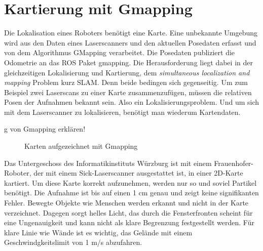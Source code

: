 \documentclass[11pt,a4paper]{article}
\begin{document}
{\section{Kartierung mit Gmapping} \cite{gmapping}
Die Lokalisation eines Roboters ben\"otigt eine Karte. Eine unbekannte Umgebung wird aus den Daten eines Laserscanners und den aktuellen Posedaten erfasst und von dem Algorithmus GMapping verarbeitet. Die Posedaten publiziert die Odometrie an das ROS Paket gmapping.
Die Herausforderung liegt dabei in der gleichzeitigen Lokalisierung und Kartierung, dem \textit{simultaneous localization and mapping} Problem kurz SLAM. Denn beide bedingen sich gegenseitig. Um zum Beispiel zwei Laserscans zu einer Karte zusammenzuf\"ugen, m\"ussen die relativen Posen der Aufnahmen bekannt sein. Also ein Lokalisierungsproblem. Und um sich mit dem Laserscanner zu lokalisieren, ben\"otigt man wiederum Kartendaten. 



g von Gmapping erklären!

\begin{figure}[h]
	\centering
	\caption{Karten aufgezeichnet mit Gmapping}
\end{figure}


Das Untergeschoss des Informatikinstituts W\"urzburg ist mit einem Frauenhofer-Roboter, der mit einem Sick-Laserscanner ausgestattet ist, in einer 2D-Karte kartiert.  Um diese Karte korrekt aufzunehmen, werden nur so und soviel Partikel ben\"otigt. Die Aufnahme ist bis auf einen 1 cm genau und zeigt keine signifikanten Fehler. Bewegte Objekte wie Menschen werden erkannt und nicht in der Karte verzeichnet. Dagegen sorgt helles Licht, das durch die Fensterfronten scheint f\"ur eine Ungenauigkeit und kann nicht als klare Begrenzung festgestellt werden. F\"ur klare Linie wie W\"ande ist es wichtig, das Gel\"ande mit einem Geschwindgkeitslimit von 1 m/s abzufahren. 



}
\end{document}

